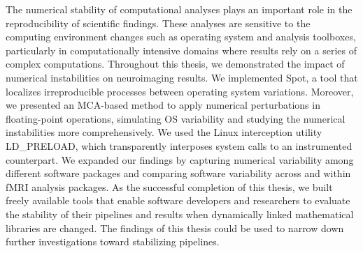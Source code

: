 The numerical stability of computational analyses plays an important role in the reproducibility
of scientific findings. These analyses are sensitive to the
computing environment changes such as operating system and analysis toolboxes, particularly
in computationally intensive domains where results rely on a series of complex computations.
Throughout this thesis, we demonstrated the impact of numerical instabilities on neuroimaging results. 
We implemented Spot, a tool that localizes irreproducible processes between operating system variations.
Moreover, we presented an MCA-based method to apply numerical perturbations in floating-point operations,
simulating OS variability and studying the numerical instabilities more comprehensively.
We used the Linux interception utility LD\_PRELOAD,
which transparently interposes system calls to an instrumented counterpart.
We expanded our findings by capturing numerical variability among different software packages and comparing 
software variability across and within fMRI analysis packages.
As the successful completion of this thesis, we built freely available tools that enable software developers
and researchers to evaluate the stability of their pipelines and results when dynamically
linked mathematical libraries are changed. The findings of this thesis could be
used to narrow down further investigations toward stabilizing pipelines.

